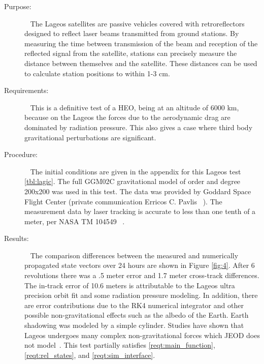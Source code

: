 \label{test:lageo}
\begin{description}
\item[Purpose:] \ \newline
The Lageos satellites are passive vehicles covered with retroreflectors designed to reflect
laser beams transmitted from ground stations. By measuring the time between transmission of
the beam and reception of the reflected signal from the satellite, stations can precisely
measure the distance between themselves and the satellite. These distances can be used to
calculate station positions to within 1-3 cm.
\item[Requirements:] \ \newline
This is a definitive test of a HEO, being at an altitude of 6000 km, because on the Lageos
the forces due to the aerodynamic drag are dominated by radiation pressure. This also gives
a case where third body gravitational perturbations are significant.
\item[Procedure:]\ \newline
The initial conditions are given in the appendix for this Lageos test \ref{tbl:lagic}. The
full GGM02C gravitational model of order and degree 200x200 was used in this test. The data
was provided by Goddard Space Flight Center (private communication Erricos C. Pavlis ~\cite{pav}).
The measurement data by laser tracking is accurate to less than one tenth of a meter, per
NASA TM 104549 ~\cite{lga}.
\item[Results:]\ \newline
The comparison differences between the measured and numerically propagated state vectors over
24 hours are shown in Figure \ref{fig:4}. After 6 revolutions there was a .5 meter error and
1.7 meter cross-track differences. The in-track error of 10.6 meters is attributable to the
Lageos ultra precision orbit fit and some radiation pressure modeling. In addition, there are
error contributions due to the RK4 numerical integrator and other possible non-gravitational
effects such as the albedo of the Earth. Earth shadowing was modeled by a simple cylinder.
Studies have shown that Lageos undergoes many complex non-gravitational forces which JEOD does
not model~\cite{rub}.  This test partially satisfies \ref{reqt:main_function}, \ref{reqt:rel_states},
and \ref{reqt:sim_interface}.
\begin{figure}
\begin{center}

\end{center}
\end{figure}
\end{description}

